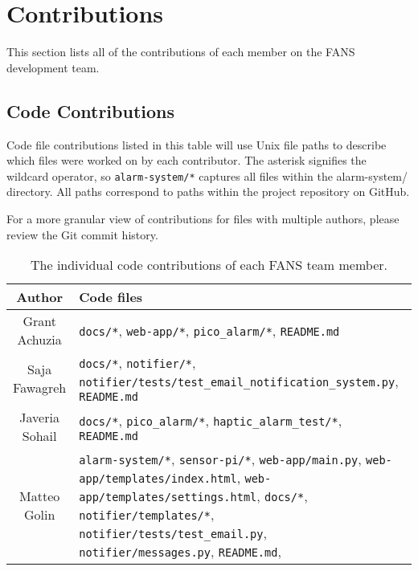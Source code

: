 \section{Contributions}

This section lists all of the contributions of each member on the FANS development team.

\subsection{Code Contributions}

Code file contributions listed in this table will use Unix file paths to describe which files were worked on by each
contributor. The asterisk signifies the wildcard operator, so \texttt{alarm-system/*} captures all files within the
alarm-system/ directory. All paths correspond to paths within the project repository on GitHub.

For a more granular view of contributions for files with multiple authors, please review the Git commit history.

\begin{table}[H]
    \centering
    \begin{tabular}{| c | p{5in} |}
        \hline
        Author         & Code files \\
        \hline
        Grant Achuzia  & {
                \footnotesize
                \texttt{docs/*}, \texttt{web-app/*}, \texttt{pico\_alarm/*}, \texttt{README.md}
        }                           \\
        \hline
        Saja Fawagreh  & {
                \footnotesize
                \texttt{docs/*}, \texttt{notifier/*}, \texttt{notifier/tests/test\_email\_notification\_system.py}, \texttt{README.md}
        }                           \\
        \hline
        Javeria Sohail & {
                \footnotesize
                \texttt{docs/*}, \texttt{pico\_alarm/*}, \texttt{haptic\_alarm\_test/*}, \texttt{README.md}
        }                           \\
        \hline
        Matteo Golin   &
        {
                \footnotesize
                \texttt{alarm-system/*}, \texttt{sensor-pi/*}, \texttt{web-app/main.py},
                \texttt{web-app/templates/index.html}, \texttt{web-app/templates/settings.html}, \texttt{docs/*},
                \texttt{notifier/templates/*}, \texttt{notifier/tests/test\_email.py}, \texttt{notifier/messages.py},
                \texttt{README.md},
        }                           \\
        \hline
    \end{tabular}
    \caption{The individual code contributions of each FANS team member.}
\end{table}


